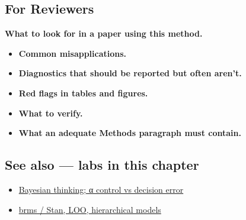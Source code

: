 \documentclass[
]{article}
\providecommand{\tightlist}{%
  \setlength{\itemsep}{0pt}\setlength{\parskip}{0pt}}
\begin{document}
\subsection{For Reviewers}\label{for-reviewers}

\textbf{What to look for in a paper using this method.}

\begin{itemize}
\tightlist
\item
  \textbf{Common misapplications.}
\item
  \textbf{Diagnostics that should be reported but often aren't.}
\item
  \textbf{Red flags in tables and figures.}
\item
  \textbf{What to verify.}
\item
  \textbf{What an adequate Methods paragraph must contain.}
\end{itemize}

\subsection{See also --- labs in this
chapter}\label{see-also-labs-in-this-chapter}

\begin{itemize}
\tightlist
\item
  \href{labs/lab-bayesian-thinking-control-vs-decision-error.Rmd}{Bayesian
  thinking; α control vs decision error}
\item
  \href{labs/lab-brms-stan-loo-hierarchical-models.Rmd}{brms / Stan,
  LOO, hierarchical models}
\end{itemize}
\end{document}
